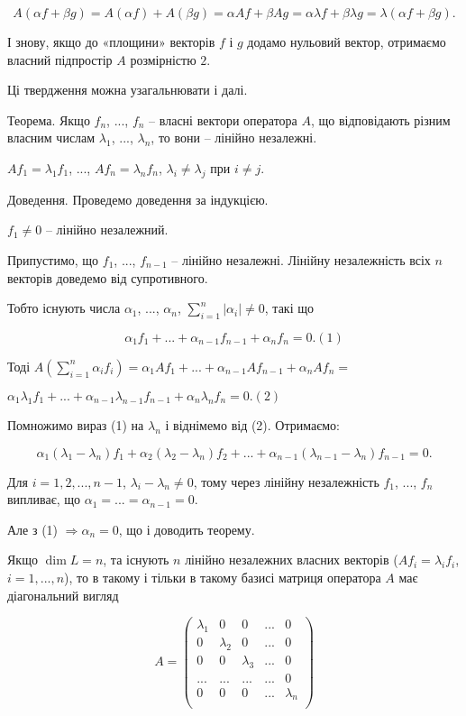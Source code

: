 $$A(\alpha f + \beta g) = A(\alpha f) + A(\beta g) = \alpha A f + \beta A g
= \alpha \lambda f + \beta \lambda g = \lambda(\alpha f + \beta g).$$

І знову, якщо до «площини» векторів $f$ і $g$ додамо нульовий вектор,
отримаємо власний підпростір $A$ розмірністю $2$.

Ці твердження можна узагальнювати і далі.

Теорема. Якщо $f_n$, ..., $f_n$ -- власні вектори оператора $A$, що відповідають
різним власним числам $\lambda_1$, ..., $\lambda_n$, то вони -- лінійно незалежні.

$A f_1 = \lambda_1 f_1$, ..., $A f_n = \lambda_n f_n$, $\lambda_i \neq \lambda_j$ при $i \neq j$.

Доведення. Проведемо доведення за індукцією.

$f_1 \neq 0$ -- лінійно незалежний.

Припустимо, що $f_1$, ..., $f_{n-1}$ -- лінійно незалежні. Лінійну незалежність
всіх $n$ векторів доведемо від супротивного.

Тобто існують числа $\alpha_1$, ..., $\alpha_n$, $\sum\limits_{i=1}^n |\alpha_i| \neq 0$, такі що

$$\alpha_1 f_1 + ... + \alpha_{n-1} f_{n-1} + \alpha_n f_n = 0. (1)$$


Тоді $A\left( \sum\limits_{i=1}^n \alpha_i f_i \right) = \alpha_1 A f_1 + ...  + \alpha_{n-1} A f_{n-1} + \alpha_n A f_n =$

$\alpha_1 \lambda_1 f_1 + ... + \alpha_{n-1} \lambda_{n-1} f_{n-1} + \alpha_n \lambda_n f_n = 0. (2)$


Помножимо вираз (1) на $\lambda_n$ і віднімемо від (2). Отримаємо:

$$\alpha_1(\lambda_1 - \lambda_n)f_1 + \alpha_2(\lambda_2 - \lambda_n)f_2 + ... + \alpha_{n-1}(\lambda_{n-1} - \lambda_n)f_{n-1} = 0.$$


Для $i = 1,2,...,n -1$, $\lambda_i - \lambda_n \neq 0$, тому через лінійну незалежність
$f_1$, ..., $f_n$ випливає, що $\alpha_1 = ... = \alpha_{n-1} = 0$.

Але з (1) $\Rightarrow \alpha_n = 0$, що і доводить теорему.

Якщо $\dim L = n$, та існують $n$ лінійно незалежних власних векторів
($A f_i = \lambda_i f_i$, $i = 1, ..., n$), то в такому і тільки в такому базисі матриця оператора
$A$ має діагональний вигляд

$$A = \begin{pmatrix}
	\lambda_1 & 0 & 0 & ... & 0 \\
	0 & \lambda_2 & 0 & ... & 0 \\
	0 & 0 & \lambda_3 & ... & 0 \\
	... & ... & ... & ... & 0 \\
	0 & 0 & 0 & ... & \lambda_n \\
\end{pmatrix} $$

